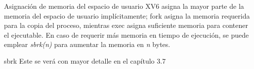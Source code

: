 \documentclass{libs/ufc_format}
\begin{document}
\begin{frame}{Asignación de memoria del espacio de usuario}
  XV6 asigna la mayor parte de la memoria del espacio de usuario implícitamente; fork asigna la memoria requerida para la copia del proceso, mientras exec asigna suficiente memoria para contener el ejecutable. En caso de requerir más memoria en tiempo de ejecución, se puede emplear \textit{sbrk(n)} para aumentar la memoria en \textit{n} bytes.

  \begin{block}{sbrk}
    Este se verá con mayor detalle en el capítulo 3.7
  \end{block}
\end{frame}

\end{document}
